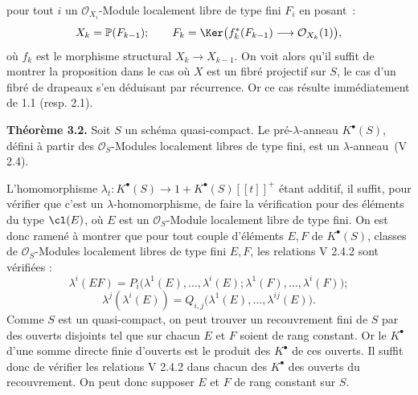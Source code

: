 pour tout \(i\) un \(\mathcal O_{X_i}\)-Module localement libre de type fini \(F_i\) en posant~:
\[
  X_k=\mathbb P(F_{k-1});\qquad
  F_k=\Ker\bigl(f_k^*(F_{k-1})\longrightarrow \mathcal O_{X_k}(1)\bigr),
\]
où \(f_k\) est le morphisme structural \(X_k\to X_{k-1}\). On voit alors qu'il suffit de montrer la proposition dans le cas où \(X\) est un fibré projectif sur \(S\), le cas d'un fibré de drapeaux s'en déduisant par récurrence. Or ce cas résulte immédiatement de 1.1 (resp. 2.1).

\textbf{Théorème 3.2.} Soit \(S\) un schéma quasi-compact. Le pré-\(\lambda\)-anneau \(K^{\bullet}(S)\), défini à partir des \(\mathcal O_S\)-Modules localement libres de type fini, est un \(\lambda\)-anneau~(V 2.4).

L'homomorphisme \(\lambda_t:K^{\bullet}(S)\longrightarrow 1+K^{\bullet}(S)[[t]]^+\) étant additif, il suffit, pour vérifier que c'est un \(\lambda\)-homomorphisme, de faire la vérification pour des éléments du type \(\cl(E)\), où \(E\) est un \(\mathcal O_S\)-Module localement libre de type fini. On est donc ramené à montrer que pour tout couple d'éléments \(E,F\) de \(K^{\bullet}(S)\), classes de \(\mathcal O_S\)-Modules localement libres de type fini \(E,F\), les relations V 2.4.2 sont vérifiées :
\[
  \lambda^i(EF)=P_i\bigl(\lambda^1(E),\ldots,\lambda^i(E);\lambda^1(F),\ldots,\lambda^i(F)\bigr);
\]
\[
  \lambda^j(\lambda^i(E))=Q_{i,j}\bigl(\lambda^1(E),\ldots,\lambda^{ij}(E)\bigr).
\]
Comme \(S\) est un quasi-compact, on peut trouver un recouvrement fini de \(S\) par des ouverts disjoints tel que sur chacun \(E\) et \(F\) soient de rang constant. Or le \(K^{\bullet}\) d'une somme directe finie d'ouverts est le produit des \(K^{\bullet}\) de ces ouverts. Il suffit donc de vérifier les relations V 2.4.2 dans chacun des \(K^{\bullet}\) des ouverts du recouvrement. On peut donc supposer \(E\) et \(F\) de rang constant sur \(S\).

